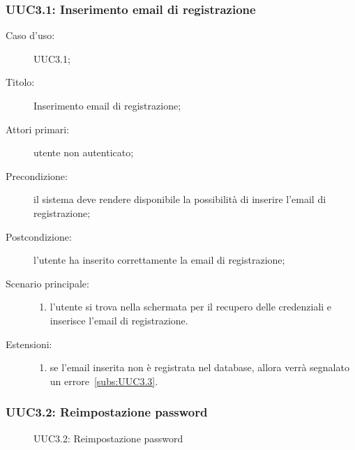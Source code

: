 \documentclass[../../../analisi-dei-requisiti.tex]{subfiles}
\begin{document}
\subsubsection{UUC3.1: Inserimento email di registrazione}%
\label{subs:UUC3.1}
\begin{description}
  \item[Caso d’uso:] UUC3.1;
  \item[Titolo:] Inserimento email di registrazione;
  \item[Attori primari:] utente non autenticato;
  \item[Precondizione:] il sistema deve rendere disponibile la possibilità di inserire l'email di registrazione;
  \item[Postcondizione:] l'utente ha inserito correttamente la email di registrazione;
  \item[Scenario principale:]
        \begin{enumerate}
          \item l'utente si trova nella schermata per il recupero delle credenziali e inserisce l'email di registrazione.
        \end{enumerate}
  \item[Estensioni:]
        \begin{enumerate}
          \item se l'email inserita non è registrata nel database, allora verrà segnalato un errore~\ref{subs:UUC3.3}.
        \end{enumerate}
\end{description}

\subsubsection{UUC3.2: Reimpostazione password}%
\label{subs:UUC3.2}

\begin{figure}[H]
  \centering
  \caption{UUC3.2: Reimpostazione password}%
  \label{fig:uuc3.2}
\end{figure}
\end{document}
